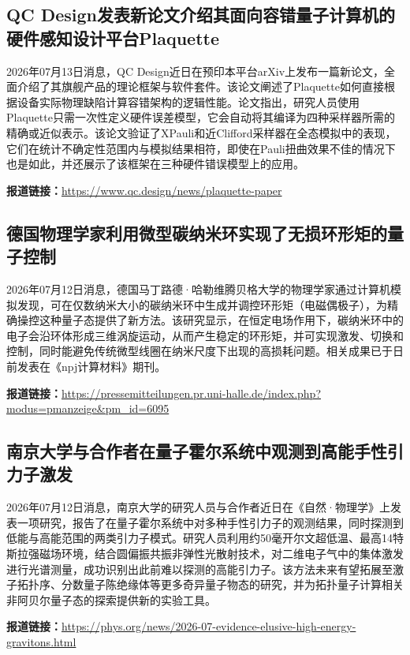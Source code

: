 \documentclass[12pt,a4paper]{ctexart}
\begin{document}
\subsection{ QC Design发表新论文介绍其面向容错量子计算机的硬件感知设计平台Plaquette }

2026年07月13日消息，QC Design近日在预印本平台arXiv上发布一篇新论文，全面介绍了其旗舰产品的理论框架与软件套件。该论文阐述了Plaquette如何直接根据设备实际物理缺陷计算容错架构的逻辑性能。论文指出，研究人员使用Plaquette只需一次性定义硬件误差模型，它会自动将其编译为四种采样器所需的精确或近似表示。该论文验证了XPauli和近Clifford采样器在全态模拟中的表现，它们在统计不确定性范围内与模拟结果相符，即使在Pauli扭曲效果不佳的情况下也是如此，并还展示了该框架在三种硬件错误模型上的应用。

\noindent\textbf{报道链接：}\url{https://www.qc.design/news/plaquette-paper}

\subsection{ 德国物理学家利用微型碳纳米环实现了无损环形矩的量子控制 }

2026年07月12日消息，德国马丁路德·哈勒维腾贝格大学的物理学家通过计算机模拟发现，可在仅数纳米大小的碳纳米环中生成并调控环形矩（电磁偶极子），为精确操控这种量子态提供了新方法。该研究显示，在恒定电场作用下，碳纳米环中的电子会沿环体形成三维涡旋运动，从而产生稳定的环形矩，并可实现激发、切换和控制，同时能避免传统微型线圈在纳米尺度下出现的高损耗问题。相关成果已于日前发表在《npj计算材料》期刊。

\noindent\textbf{报道链接：}\url{https://pressemitteilungen.pr.uni-halle.de/index.php?modus=pmanzeige\&pm\_id=6095}

\subsection{ 南京大学与合作者在量子霍尔系统中观测到高能手性引力子激发 }

2026年07月12日消息，南京大学的研究人员与合作者近日在《自然·物理学》上发表一项研究，报告了在量子霍尔系统中对多种手性引力子的观测结果，同时探测到低能与高能范围的两类引力子模式。研究人员利用约50毫开尔文超低温、最高14特斯拉强磁场环境，结合圆偏振共振非弹性光散射技术，对二维电子气中的集体激发进行光谱测量，成功识别出此前难以探测的高能引力子。该方法未来有望拓展至激子拓扑序、分数量子陈绝缘体等更多奇异量子物态的研究，并为拓扑量子计算相关非阿贝尔量子态的探索提供新的实验工具。

\noindent\textbf{报道链接：}\url{https://phys.org/news/2026-07-evidence-elusive-high-energy-gravitons.html}
\end{document}
